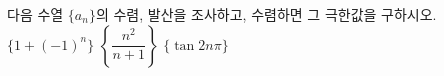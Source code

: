 다음 수열 $\{a_n\}$의 수렴, 발산을 조사하고, 수렴하면 그 극한값을 구하시오.
 $\{1+(-1)^n\}$
 $\left\{\dfrac{n^2}{n+1}\right\}$
 $\{\tan 2n\pi\}$
